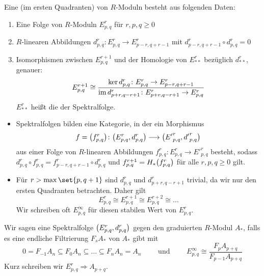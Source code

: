 \begin{definition}[{name=[homologische Spektralfolge]},label=def:homologische_spektralfolge]
	Eine  (im ersten Quadranten) von $R$-Moduln besteht aus folgenden Daten:
	\begin{enumerate}[1.]
		\item Eine Folge von $R$-Moduln $E^r_{p,q}$ für $r,p,q\ge 0$
		\item $R$-linearen Abbildungen $d^r_{p,q} \colon E_{p,q}^r \to E^r_{p-r,q+r-1}$ mit $d^r_{p-r,q+r-1} \circ d^r_{p,q}=0$
		\item Isomorphismen zwischen $E^{r+1}_{p,q}$ und der Homologie von $E^r_{**}$ bezüglich $d^r_{**}$, genauer:
		\[
			E^{r+1}_{p,q} \cong \frac{\ker d^r_{p,q} \colon E^r_{p,q} \to E^r_{p-r,q+r-1}}{\im d^r_{p+r,q-r+1} \colon E^r_{p+r,q-r+1} \to E^r_{p,q}}
		\]
		$E^r_{**}$ heißt die  der Spektralfolge.
	\end{enumerate}
\end{definition}

\begin{bemerkung}[{name=[{Morphismen von Spektralfolgen und stabiler Wert}]},label=bem:mor_spektralfolge]
	\leavevmode
	\begin{itemize}
		\item Spektralfolgen bilden eine Kategorie, in der ein Morphismus
		\[
			f = \enbrace*{f^r_{p,q}} \colon \enbrace*{E^r_{p,q},d^r_{p,q}} \longrightarrow \enbrace*{{E'}^r_{p,q},{d'}^r_{p,q}}
		\]
		aus einer Folge von $R$-linearen Abbildungen $f^r_{p,q} \colon E^r_{p,q} \to {E'}^r_{p,q}$ besteht, sodass $d^r_{p,q} \circ f^r_{p,q} = f^r_{p-r,q+r-1} \circ d^r_{p,q}$ und $f^{r+1}_{p,q} = H_* \enbrace*{f^r_{p,q}}$ für alle $r,p,q\ge 0$ gilt.
		\item Für $r > \max\set{p,q+1}$ sind $d^r_{p,q}$ und $d^r_{p+r,q-r+1}$ trivial, da wir nur den ersten Quadranten betrachten. 
		Daher gilt 
		\[
			E^r_{p,q} \cong E^{r+1}_{p,q} \cong E^{r+2}_{p,q} \cong \ldots
		\]
		Wir schreiben oft $E^\infty_{p,q}$ für diesen stabilen Wert von $E^r_{p,q}$.
	\end{itemize}
\end{bemerkung}

\begin{definition}[{name=[konvergente Spektralfolge]},label=def:konvergente_spektralfolge]
	Wir sagen eine Spektralfolge $\enbrace*{E^r_{p,q},d^r_{p,q}}$  gegen den graduierten $R$-Modul $A_*$, falls es eine endliche Filtrierung $F_s A_*$ von $A_*$ gibt mit
	\[
		0 = F_{-1}A_n \subseteq F_0 A_n \subseteq \ldots \subseteq F_n A_n = A_n \qquad \text{ und }\qquad  E^\infty_{p,q} \cong \frac{F_p A_{p+q}}{F_{p-1}A_{p+q}}
	\]
	Kurz schreiben wir $E_{p,q}^r \Rightarrow A_{p+q}$.
\end{definition}

